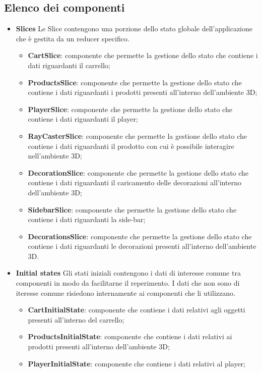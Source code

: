 \subsection{Elenco dei componenti}
\begin{itemize}
	\item \textbf{\large Slices}
	Le Slice contengono una porzione dello stato globale dell'applicazione che è gestita da un reducer specifico.
		\begin{itemize}
			\item \textbf{CartSlice}: componente che permette la gestione dello stato che contiene i dati riguardanti il carrello;
			\item \textbf{ProductsSlice}: componente che permette la gestione dello stato che contiene i dati riguardanti i prodotti 
			presenti all'interno dell'ambiente 3D;
			\item \textbf{PlayerSlice}: componente che permette la gestione dello stato che contiene i dati riguardanti il player;
			\item \textbf{RayCasterSlice}: componente che permette la gestione dello stato che contiene i dati riguardanti il
			prodotto con cui è possibile interagire nell'ambiente 3D;
			\item \textbf{DecorationSlice}: componente che permette la gestione dello stato che contiene i dati riguardanti
			il caricamento delle decorazioni all'interno dell'ambiente 3D;
			\item \textbf{SidebarSlice}: componente che permette la gestione dello stato che contiene i dati riguardanti
			la side-bar;
			\item \textbf{DecorationsSlice}: componente che permette la gestione dello stato che contiene i dati riguardanti le
			decorazioni presenti all'interno dell'ambiente 3D.
		\end{itemize}
	\item \textbf{\large Initial states}
	Gli stati iniziali contengono i dati di interesse comune tra componenti in modo da facilitarne il reperimento.
	I dati che non sono di iteresse comune risiedono internamente ai componenti che li utilizzano.
		\begin{itemize}
			\item \textbf{CartInitialState}: componente che contiene i dati relativi agli oggetti presenti all'interno del carrello;
			\item \textbf{ProductsInitialState}: componente che contiene i dati relativi ai prodotti presenti all'interno dell'ambiente 3D;
			\item \textbf{PlayerInitialState}: componente che contiene i dati relativi al player;

\end{itemize}
\end{itemize}
